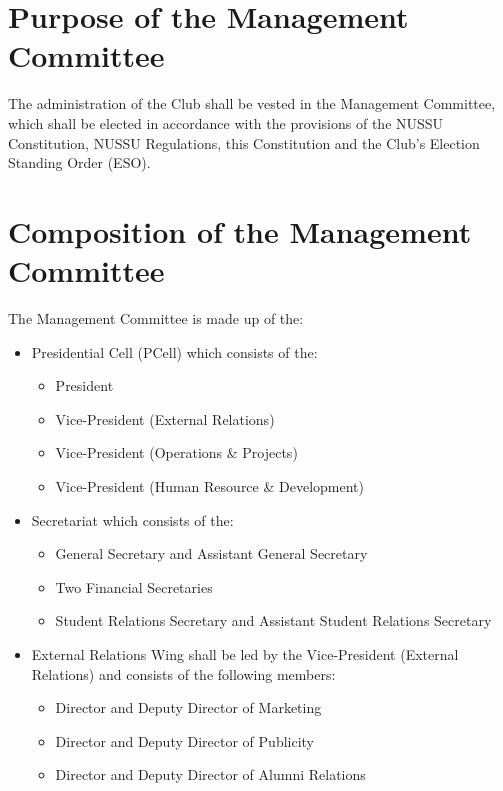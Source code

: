 
\section{Purpose of the Management Committee}
The administration of the Club shall be vested in the Management Committee, which shall be elected in accordance with the provisions of the NUSSU Constitution, NUSSU Regulations, this Constitution and the Club’s Election Standing Order (ESO).

\section{Composition of the Management Committee}
The Management Committee is made up of the:\newline
	\begin{itemize}
		\item Presidential Cell (PCell) which consists of the:
		\begin{itemize}
		\item President
		\item Vice-President (External Relations)
		\item Vice-President (Operations \& Projects)
		\item Vice-President (Human Resource \& Development)
		\end{itemize}
		
		\item Secretariat which consists of the:
		\begin{itemize}
		\item General Secretary and Assistant General Secretary
		\item Two Financial Secretaries
		\item Student Relations Secretary and Assistant Student Relations Secretary
		\end{itemize}
		
		\item External Relations Wing shall be led by the Vice-President (External Relations) and consists of the following members:
		\begin{itemize}
		\item Director and Deputy Director of Marketing
		\item Director and Deputy Director of Publicity
		\item Director and Deputy Director of Alumni Relations
		\end{itemize}
		

\end{itemize}
